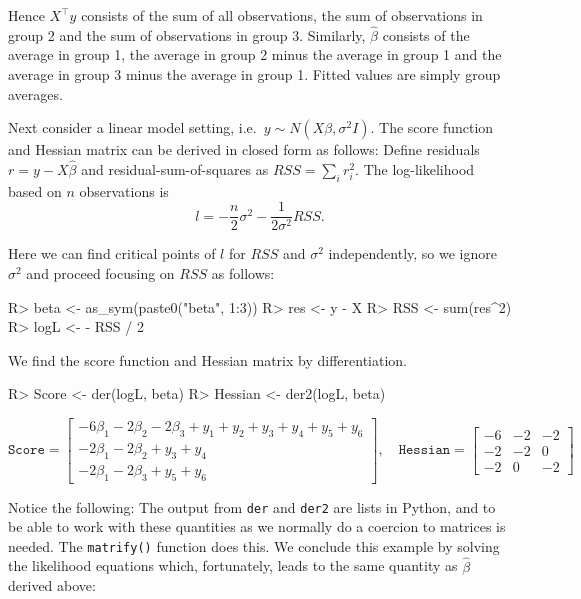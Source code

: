Hence \(X^\top y\) consists of the sum of all observations, the sum of
observations in group 2 and the sum of observations in group 3.
Similarly, \(\hat\beta\) consists of the average in group 1, the average
in group 2 minus the average in group 1 and the average in group 3 minus
the average in group 1. Fitted values are simply group averages.

Next consider a linear model setting,
i.e.~\(y\sim N(X\beta, \sigma^2 I)\). The score function and Hessian
matrix can be derived in closed form as follows: Define residuals
\(r=y - X \hat{\beta}\) and residual-sum-of-squares as
\(RSS=\sum_i r_i^2\). The log-likelihood based on \(n\) observations is
\[
 l = - \frac n 2 \sigma^2 - \frac 1 {2\sigma^2} RSS.
\]

Here we can find critical points of \(l\) for \(RSS\) and \(\sigma^2\)
independently, so we ignore \(\sigma^2\) and proceed focusing on \(RSS\)
as follows:

\begin{Schunk}
\begin{Sinput}
R> beta <- as_sym(paste0("beta", 1:3))
R> res <- y - X %
R> RSS <- sum(res^2) 
R> logL <- - RSS / 2
\end{Sinput}
\end{Schunk}

We find the score function and Hessian matrix by differentiation.

\begin{Schunk}
\begin{Sinput}
R> Score <- der(logL, beta) %
R> Hessian <- der2(logL, beta) %
\end{Sinput}
\end{Schunk}

\[
\texttt{Score}= \left[\begin{matrix}- 6 \beta_{1} - 2 \beta_{2} - 2 \beta_{3} + y_{1} + y_{2} + y_{3} + y_{4} + y_{5} + y_{6}\\- 2 \beta_{1} - 2 \beta_{2} + y_{3} + y_{4}\\- 2 \beta_{1} - 2 \beta_{3} + y_{5} + y_{6}\end{matrix}\right], \quad 
\texttt{Hessian}= \left[\begin{matrix}-6 & -2 & -2\\-2 & -2 & 0\\-2 & 0 & -2\end{matrix}\right]
\]

Notice the following: The output from \texttt{der} and \texttt{der2} are
lists in Python, and to be able to work with these quantities as we
normally do a coercion to matrices is needed. The \texttt{matrify()}
function does this. We conclude this example by solving the likelihood
equations which, fortunately, leads to the same quantity as
\(\hat\beta\) derived above:

